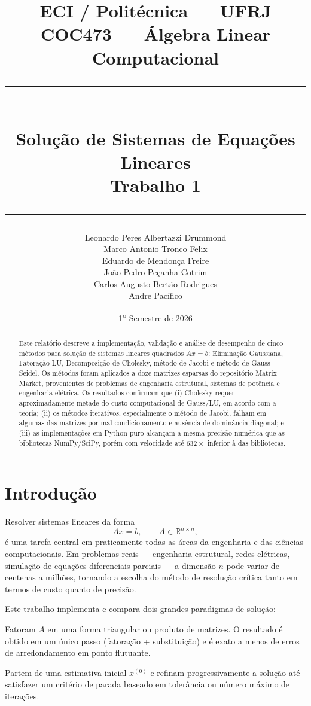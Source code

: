 \documentclass[12pt, a4paper]{article}
\title{
  \vspace{-1cm}
  {\large ECI / Politécnica — UFRJ} \\[0.4em]
  {\large COC473 — Álgebra Linear Computacional} \\[0.8em]
  \rule{\linewidth}{0.5pt} \\[0.6em]
  {\LARGE \textbf{Solução de Sistemas de Equações Lineares}} \\[0.4em]
  {\large Trabalho 1} \\[0.2em]
  \rule{\linewidth}{0.5pt}
}
\author{
  Leonardo Peres Albertazzi Drummond \\
  Marco Antonio Tronco Felix \\
  Eduardo de Mendonça Freire \\
  João Pedro Peçanha Cotrim \\
  Carlos Augusto Bertão Rodrigues \\
  Andre Pacífico
}
\date{1\textsuperscript{o} Semestre de 2026}
\begin{document}
 
\maketitle
\thispagestyle{empty}
 
\begin{abstract}
Este relatório descreve a implementação, validação e análise de desempenho de cinco
métodos para solução de sistemas lineares quadrados $Ax = b$: Eliminação Gaussiana,
Fatoração LU, Decomposição de Cholesky, método de Jacobi e método de Gauss-Seidel.
Os métodos foram aplicados a doze matrizes esparsas do repositório Matrix Market,
provenientes de problemas de engenharia estrutural,  sistemas de potência e engenharia elétrica. Os resultados
confirmam que (i) Cholesky requer aproximadamente metade do custo computacional de
Gauss/LU, em acordo com a teoria; (ii) os métodos iterativos, especialmente o método de Jacobi, falham em algumas das
matrizes por mal condicionamento e ausência de dominância diagonal; e (iii) as implementações em Python puro
alcançam a mesma precisão numérica que as bibliotecas NumPy/SciPy, porém com velocidade até $632\times$ inferior à das bibliotecas.
\end{abstract}
 
\newpage
\tableofcontents
\newpage
 
\section{Introdução}
 
Resolver sistemas lineares da forma
\begin{equation}
  Ax = b, \qquad A \in \mathbb{R}^{n \times n},
  \label{eq:sistema}
\end{equation}
é uma tarefa central em praticamente todas as áreas da engenharia e das ciências
computacionais. Em problemas reais — engenharia estrutural, redes elétricas, simulação
de equações diferenciais parciais — a dimensão $n$ pode variar de centenas a milhões,
tornando a escolha do método de resolução crítica tanto em termos de custo quanto de
precisão.
 
Este trabalho implementa e compara dois grandes paradigmas de solução:
 
\begin{description}[leftmargin=2cm, style=nextline]
  \item[Métodos diretos] Fatoram $A$ em uma forma triangular ou produto de matrizes.
    O resultado é obtido em um único passo (fatoração + substituição) e é exato a menos
    de erros de arredondamento em ponto flutuante.
  \item[Métodos iterativos] Partem de uma estimativa inicial $x^{(0)}$ e refinam
    progressivamente a solução até satisfazer um critério de parada baseado em
    tolerância ou número máximo de iterações.
\end{description}
 
\end{document}
